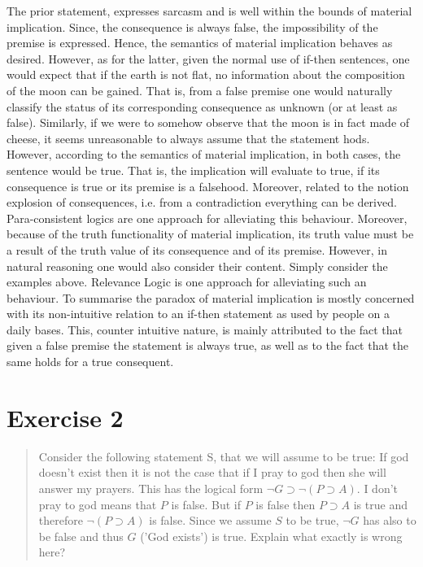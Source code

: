 \documentclass[11pt,a4paper]{article}
\begin{document}
The prior statement, expresses sarcasm and is well within the bounds of material implication. Since, the consequence is always false, the impossibility of the premise is expressed. Hence, the semantics of material implication behaves as desired. However, as for the latter, given the normal use of if-then sentences, one would expect that if the earth is not flat, no information about the composition of the moon can be gained. That is, from a false premise one would naturally classify the status of its corresponding consequence as unknown (or at least as false). Similarly, if we were to somehow observe that the moon is in fact made of cheese, it seems unreasonable to always assume that the statement hods. However, according to the semantics of material implication, in both cases, the sentence would be true. That is, the implication will evaluate to true, if its consequence is true or its premise is a falsehood. Moreover, related to the notion explosion of consequences, i.e. from a contradiction everything can be derived.  Para-consistent logics are one approach for alleviating this behaviour. 
Moreover, because of the truth functionality of material implication, its truth value must be a result of the truth value of its consequence and of its premise. However, in natural reasoning one would also consider their content. Simply consider the examples above. Relevance Logic is one approach for alleviating such an behaviour. 
To summarise the paradox of material implication is mostly concerned with its non-intuitive relation to an if-then statement as used by people on a daily bases. This, counter intuitive nature, is mainly attributed to the fact that given a false premise the statement is always true, as well as to the fact that the same holds for a true consequent.   
\cite{evans2002logic,ox,peter,wiki}


\section*{Exercise 2}

\begin{quote}
Consider the following statement S, that we will assume to be true: If god doesn’t exist then it is not the case that if I pray to god then
she will answer my prayers.
This has the logical form $\neg G \supset \neg ( P \supset A)$. I don't pray to god means that $P$ is false. But if $P$ is false then $P \supset A$ is true and therefore $ \neg ( P \supset A)$ is false. Since we assume $S$ to be true, $\neg G$ has also to be false and thus $G$ ('God exists') is true.
Explain what exactly is wrong here?
\end{quote}
\end{document}
